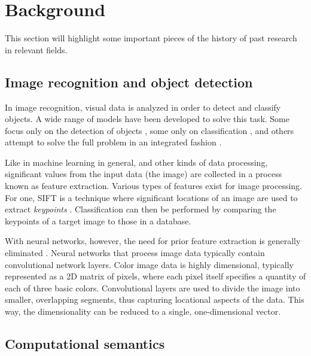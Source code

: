\def\equationautorefname{equation}
\let\subsectionautorefname\sectionautorefname
\let\subsubsectionautorefname\sectionautorefname
\glsresetall
\section{Background}
\label{sec:background}

This section will highlight some important pieces of the history of past research in relevant fields.

\subsection{Image recognition and object detection}

In image recognition, visual data is analyzed in order to detect and classify objects.
A wide range of models have been developed to solve this task.
Some focus only on the detection of objects \citep{BlaschkoLearningLocalizeObjects2008}, some only on classification \citep[e.g. ResNet,][]{HeDeepResidualLearning2015}, and others attempt to solve the full problem in an integrated fashion \citep{RedmonYouOnlyLook2015,HeMaskRCNN2017}.

Like in machine learning in general, and other kinds of data processing, significant values from the input data (the image) are collected in a process known as feature extraction.
Various types of features exist for image processing.
For one, SIFT is a technique where significant locations of an image are used to extract \textit{keypoints} \citep{LoweObjectrecognitionlocal1999}.
Classification can then be performed by comparing the keypoints of a target image to those in a database.

With neural networks, however, the need for prior feature extraction is generally eliminated \citep{HeDeepResidualLearning2015, HeMaskRCNN2017}.
Neural networks that process image data typically contain convolutional network layers.
Color image data is highly dimensional, typically represented as a 2D matrix of pixels, where each pixel itself specifies a quantity of each of three basic colors.
Convolutional layers are used to divide the image into smaller, overlapping segments, thus capturing locational aspects of the data.
This way, the dimensionality can be reduced to a single, one-dimensional vector.



\subsection{Computational semantics}
\label{sec:compsem}

